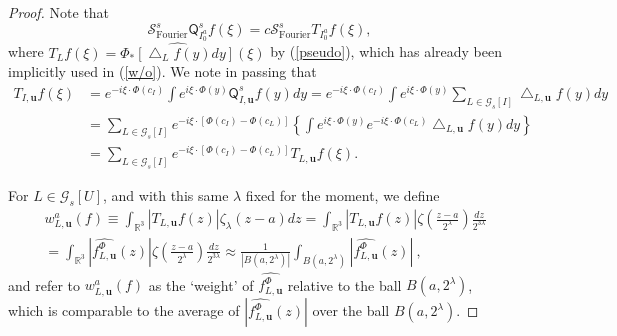 \documentclass{amsart}%
\theoremstyle{plain}
\numberwithin{equation}{section}
\begin{document}
\begin{proof}
Note that
\begin{equation}
\mathcal{S}_{\operatorname*{Fourier}}^{s}\mathsf{Q}_{I_{0}^{a}}^{s}f\left(
\xi\right)  =c\mathcal{S}_{\operatorname*{Fourier}}^{s}T_{I_{0}^{a}}f\left(
\xi\right)  , \label{Q and T}%
\end{equation}
where $T_{L}f\left(  \xi\right)  =\widehat{\Phi_{\ast}\left[  \bigtriangleup
_{L}f\left(  y\right)  dy\right]  }\left(  \xi\right)  $ by (\ref{pseudo}),
which has already been implicitly used in (\ref{w/o}). We note in passing that%
\begin{align*}
T_{I,\mathbf{u}}f\left(  \xi\right)   &  =e^{-i\xi\cdot\Phi\left(
c_{I}\right)  }\int e^{i\xi\cdot\Phi\left(  y\right)  }\mathsf{Q}%
_{I,\mathbf{u}}^{s}f\left(  y\right)  dy=e^{-i\xi\cdot\Phi\left(
c_{I}\right)  }\int e^{i\xi\cdot\Phi\left(  y\right)  }\sum_{L\in
\mathcal{G}_{s}\left[  I\right]  }\bigtriangleup_{L,\mathbf{u}}f\left(
y\right)  dy\\
&  =\sum_{L\in\mathcal{G}_{s}\left[  I\right]  }e^{-i\xi\cdot\left[
\Phi\left(  c_{I}\right)  -\Phi\left(  c_{L}\right)  \right]  }\left\{  \int
e^{i\xi\cdot\Phi\left(  y\right)  }e^{-i\xi\cdot\Phi\left(  c_{L}\right)
}\bigtriangleup_{L,\mathbf{u}}f\left(  y\right)  dy\right\} \\
&  =\sum_{L\in\mathcal{G}_{s}\left[  I\right]  }e^{-i\xi\cdot\left[
\Phi\left(  c_{I}\right)  -\Phi\left(  c_{L}\right)  \right]  }T_{L,\mathbf{u}%
}f\left(  \xi\right)  .
\end{align*}


For $L\in\mathcal{G}_{s}\left[  U\right]  $, and with this same $\lambda$
fixed for the moment, we define%
\begin{align*}
&  w_{L,\mathbf{u}}^{a}\left(  f\right)  \equiv\int_{\mathbb{R}^{3}}\left\vert
T_{L,\mathbf{u}}f\left(  z\right)  \right\vert \zeta_{\lambda}\left(
z-a\right)  dz=\int_{\mathbb{R}^{3}}\left\vert T_{L,\mathbf{u}}f\left(
z\right)  \right\vert \zeta\left(  \frac{z-a}{2^{\lambda}}\right)  \frac
{dz}{2^{3\lambda}}\\
&  =\int_{\mathbb{R}^{3}}\left\vert \widehat{f_{L,\mathbf{u}}^{\Phi}}\left(
z\right)  \right\vert \zeta\left(  \frac{z-a}{2^{\lambda}}\right)  \frac
{dz}{2^{3\lambda}}\approx\frac{1}{\left\vert B\left(  a,2^{\lambda}\right)
\right\vert }\int_{B\left(  a,2^{\lambda}\right)  }\left\vert \widehat
{f_{L,\mathbf{u}}^{\Phi}}\left(  z\right)  \right\vert \ ,
\end{align*}
and refer to $w_{L,\mathbf{u}}^{a}\left(  f\right)  $ as the `weight' of
$\widehat{f_{L,\mathbf{u}}^{\Phi}}$ relative to the ball $B\left(
a,2^{\lambda}\right)  $, which is comparable to the average of $\left\vert
\widehat{f_{L,\mathbf{u}}^{\Phi}}\left(  z\right)  \right\vert $ over the ball
$B\left(  a,2^{\lambda}\right)  $.


\end{proof}
\end{document}
